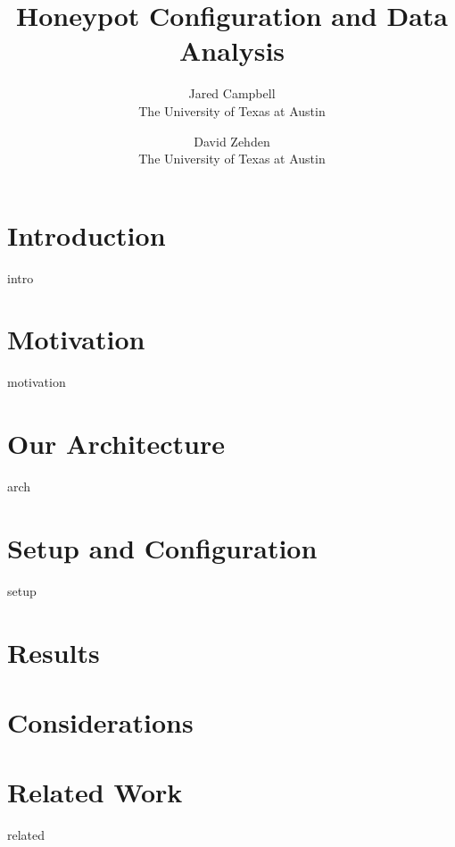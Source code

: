 \documentclass{sig-alternate}
\newcommand{\ignore}[1]{}
\begin{document}
\title{ Honeypot Configuration and Data Analysis }
\author{Jared Campbell\\The University of Texas at Austin  \and David Zehden\\The University of Texas at Austin}


\maketitle

\begin{abstract}
 
\end{abstract}

\section{Introduction}
\label{sec:intro}
 {intro}

\section{Motivation}
\label{sec:motivation}
 {motivation}

\ignore{Sometimes background is merged into motivation, and is not required separately.}

\section{Our Architecture}
\label{sec:arch}
 {arch}

\section{Setup and Configuration}
\label{sec:setup}
 {setup}

\section{Results}
\label{sec:results}


\section{Considerations}
\label{sec:considerations}


\section{Related Work}
\label{sec:related}
 {related}
\end{document}
